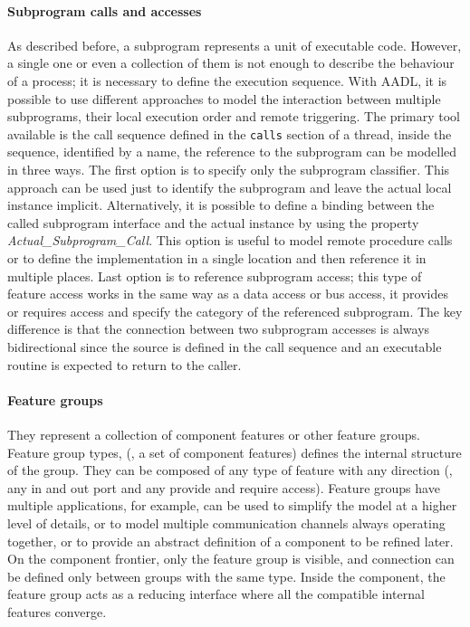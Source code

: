 \paragraph{Subprogram calls and accesses}
As described before, a subprogram represents a unit of executable code. However, a single one or even a collection of them is not enough to describe the behaviour of a process; it is necessary to define the execution sequence. With AADL, it is possible to use different approaches to model the interaction between multiple subprograms, their local execution order and remote triggering. The primary tool available is the call sequence defined in the \texttt{calls} section of a thread, inside the sequence, identified by a name, the reference to the subprogram can be modelled in three ways. The first option is to specify only the subprogram classifier. This approach can be used just to identify the subprogram and leave the actual local instance implicit. Alternatively, it is possible to define a binding between the called subprogram interface and the actual instance by using the property \textit{Actual\_Subprogram\_Call}. This option is useful to model remote procedure calls or to define the implementation in a single location and then reference it in multiple places. Last option is to reference subprogram access; this type of feature access works in the same way as a data access or bus access, it provides or requires access and specify the category of the referenced subprogram. The key difference is that the connection between two subprogram accesses is always bidirectional since the source is defined in the call sequence and an executable routine is expected to return to the caller.

\paragraph{Feature groups}
They represent a collection of component features or other feature groups. Feature group types, (\ie, a set of component features) defines the internal structure of the group. They can be composed of any type of feature with any direction (\ie, any in and out port and any provide and require access). Feature groups have multiple applications, for example, can be used to simplify the model at a higher level of details, or to model multiple communication channels always operating together, or to provide an abstract definition of a component to be refined later. On the component frontier, only the feature group is visible, and connection can be defined only between groups with the same type. Inside the component, the feature group acts as a reducing interface where all the compatible internal features converge.

